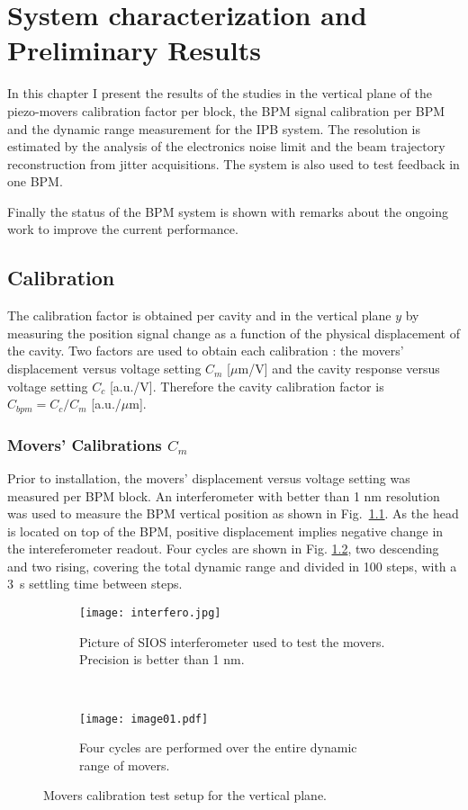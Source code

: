 \chapter{System characterization and Preliminary Results}
In this chapter I present the results of the studies in the vertical plane of the piezo-movers calibration factor per block, the BPM signal calibration per BPM and the dynamic range measurement for the IPB system. The resolution is estimated by the analysis of the electronics noise limit and the beam trajectory reconstruction from jitter acquisitions. The system is also used to test feedback in one BPM.\par
Finally the status of the BPM system is shown with remarks about the ongoing work to improve the current performance.\par
\section{Calibration}\label{s:cals}
The calibration factor is obtained per cavity and in the vertical plane $y$ by measuring the position signal change as a function of the physical displacement of the cavity. Two factors are used to obtain each calibration : the movers' displacement versus voltage setting $C_m$ [$\mu$m/V] and the cavity response versus voltage setting $C_c$ [a.u./V]. Therefore the cavity calibration factor is $C_{bpm}=C_c/C_m$ [a.u./$\mu$m].\par
\subsection{Movers' Calibrations \texorpdfstring{$C_m$}{Cm}}\label{s:calcm}
Prior to installation, the movers' displacement versus voltage setting was measured per BPM block. An interferometer with better than 1 nm resolution was used to measure the BPM vertical position as shown in Fig.~\ref{f:interfero}. As the head is located on top of the BPM, positive displacement implies negative change in the intereferometer readout. Four cycles are shown in Fig. \ref{f:fourcycles}, two descending and two rising, covering the total dynamic range and divided in 100 steps, with a 3~s settling time between steps.\par
\begin{figure}[!htb]
\centering
\begin{subfigure}[b]{0.9\textwidth}
\centering
\texttt{[image: interfero.jpg]}\caption{Picture of SIOS interferometer used to test the movers. Precision is better than 1 nm.}\label{f:interfero}
\end{subfigure}\\%
\begin{subfigure}[b]{0.9\textwidth}
\centering
\texttt{[image: image01.pdf]}\caption{Four cycles are performed over the entire dynamic range of movers.}\label{f:fourcycles}
\end{subfigure}\caption{Movers calibration test setup for the vertical plane.}\label{f:cmtest}
\end{figure}
